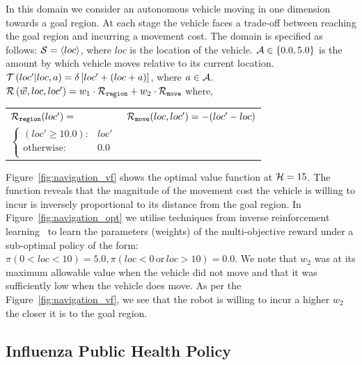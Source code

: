 In this domain we consider an autonomous vehicle moving in one dimension towards a goal region. At each stage the vehicle faces a trade-off between reaching the goal region and incurring a movement cost. The domain is specified as follows: {\footnotesize $ \mathcal{S} = \left\langle loc \right\rangle$}, where $ loc $ is the location of the vehicle. {\footnotesize $ \mathcal{A} \in \left\lbrace 0.0, 5.0 \right\rbrace $} is the amount by which vehicle moves relative to its current location. {\footnotesize $ \mathcal{T}\left( loc' | loc, a \right) = \delta \left[ loc' + (loc + a) \right] $}, where {\footnotesize $ a \in \mathcal{A} $}. {\footnotesize $ \mathcal{R}\left(\vec{w}, loc, loc'\right) = w_1 \cdot \mathcal{R}_{\mathtt{region}} + w_2 \cdot \mathcal{R}_{\mathtt{move}} $} where,
{\footnotesize 
    \abovedisplayskip=10pt
    \belowdisplayskip=0pt
    \renewcommand{\arraystretch}{1.5}
    \begin{tabular}{ll}    
        $ \mathcal{R}_{\mathtt{region}}(loc') = $ &  $  \mathcal{R}_{\mathtt{move}}(loc, loc') = - (loc' - loc)$ \\
        \qquad $ \begin{cases}
        (loc' \geq 10.0 ) : & loc' \\
        \text{otherwise} : & 0.0 \\
        \end{cases} $ & $ $\\
    \end{tabular}
} 

Figure~\ref{fig:navigation_vf} shows the optimal value function at {\footnotesize$ \mathcal{H} = 15 $}. The function reveals that the magnitude of the movement cost the vehicle is willing to incur is inversely proportional to its distance from the goal region. In Figure~\ref{fig:navigation_opt} we utilise techniques from inverse reinforcement learning~\parencite{Ng_ICML_2000} to learn the parameters (weights) of the multi-objective reward under a sub-optimal policy of the form:  {\footnotesize $ \pi(0 < loc < 10) = 5.0,  \pi(loc < 0 \,\mathrm{or}\, loc > 10) = 0.0$}. We note that {\footnotesize $ w_2 $} was at its maximum allowable value when the vehicle did not move and that it was sufficiently low when the vehicle does move. As per the Figure~\ref{fig:navigation_vf}, we see that the robot is willing to incur a higher {\footnotesize $ w_2 $} the closer it is to the goal region.

\subsection{Influenza Public Health Policy}
\label{sec:results_influenza}

